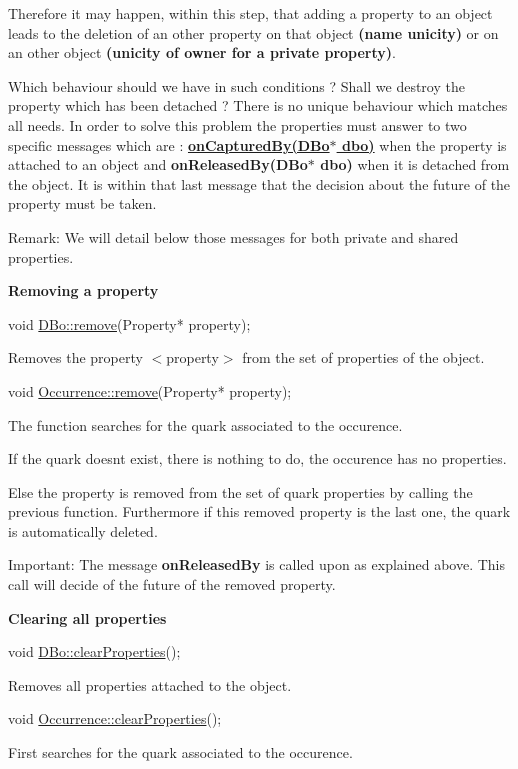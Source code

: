Therefore it may happen, within this step, that adding a property to an object leads to the deletion of an other property on that object {\bfseries (name unicity)} or on an other object {\bfseries (unicity of owner for a private property)}.

Which behaviour should we have in such conditions ? Shall we destroy the property which has been detached ? There is no unique behaviour which matches all needs. In order to solve this problem the properties must answer to two specific messages which are \+: {\bfseries \hyperlink{classHurricane_1_1Property_ac7b936414d9d85bb6509100b5dd6a667}{on\+Captured\+By(\+D\+Bo$\ast$ dbo)}} when the property is attached to an object and {\bfseries on\+Released\+By(D\+Bo$\ast$ dbo)} when it is detached from the object. It is within that last message that the decision about the future of the property must be taken.

\begin{DoxyParagraph}{Remark\+:}
We will detail below those messages for both private and shared properties.
\end{DoxyParagraph}
{\bfseries Removing a property} 
\begin{DoxyCode}
\textcolor{keywordtype}{void} \hyperlink{classHurricane_1_1DBo_a7833a1f0b8c704930bdc00861e63cf5e}{DBo::remove}(Property* property);
\end{DoxyCode}
 Removes the property {\ttfamily $<$property$>$} from the set of properties of the object. 
\begin{DoxyCode}
\textcolor{keywordtype}{void} \hyperlink{classHurricane_1_1Occurrence_a774404aa5eb01371f64cf5fda3f3ffbf}{Occurrence::remove}(Property* property);
\end{DoxyCode}
 The function searches for the quark associated to the occurence.

If the quark doesn\textquotesingle{}t exist, there is nothing to do, the occurence has no properties.

Else the property is removed from the set of quark properties by calling the previous function. Furthermore if this removed property is the last one, the quark is automatically deleted.

\begin{DoxyParagraph}{Important\+:}
The message {\bfseries on\+Released\+By} is called upon as explained above. This call will decide of the future of the removed property.
\end{DoxyParagraph}
{\bfseries Clearing all properties} 
\begin{DoxyCode}
\textcolor{keywordtype}{void} \hyperlink{classHurricane_1_1DBo_a3e02f3d665cb0b2120df2fdfe9c3df4f}{DBo::clearProperties}();
\end{DoxyCode}
 Removes all properties attached to the object. 
\begin{DoxyCode}
\textcolor{keywordtype}{void} \hyperlink{classHurricane_1_1Occurrence_ae9b269d39f3f68645d6d396d7ab5d8b7}{Occurrence::clearProperties}();
\end{DoxyCode}
 First searches for the quark associated to the occurence.


